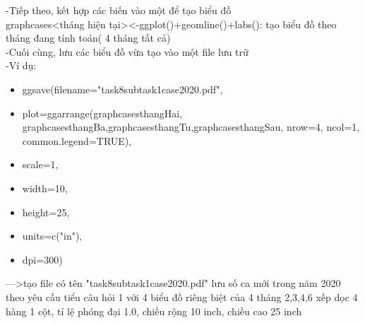 \documentclass[a4paper]{article}
\theoremstyle{definition}
\begin{document}
\begin{enumerate}[i)]
        -Tiếp theo, kết hợp các biến vào một để tạo biểu đồ\\
        graphcases<tháng hiện tại><-ggplot()+geomline()+labs(): tạo biểu đồ theo tháng đang tính toán( 4 tháng tất cả)\\
        
        -Cuối cùng, lưu các biểu đồ vừa tạo vào một file lưu trữ\\
        -Ví dụ:\\
        \begin{itemize}
            \item ggsave(filename="task8subtask1case2020.pdf",\\
            \item plot=ggarrange(graphcasesthangHai, graphcasesthangBa,graphcasesthangTu,graphcasesthangSau, nrow=4, ncol=1, common.legend=TRUE),\\
            \item scale=1,\\
            \item width=10,\\
            \item height=25,\\
            \item units=c("in"),\\
            \item dpi=300)\\
        \end{itemize}
        --->tạo file có tên "task8subtask1case2020.pdf" lưu số ca mới trong năm 2020 theo yêu cầu tiểu câu hỏi 1 với 4 biểu đồ riêng biệt của 4 tháng 2,3,4,6 xếp dọc 4 hàng 1 cột, tỉ lệ phóng đại 1.0, chiều rộng 10 inch, chiều cao 25 inch\\
        

\end{enumerate}
\end{document}
